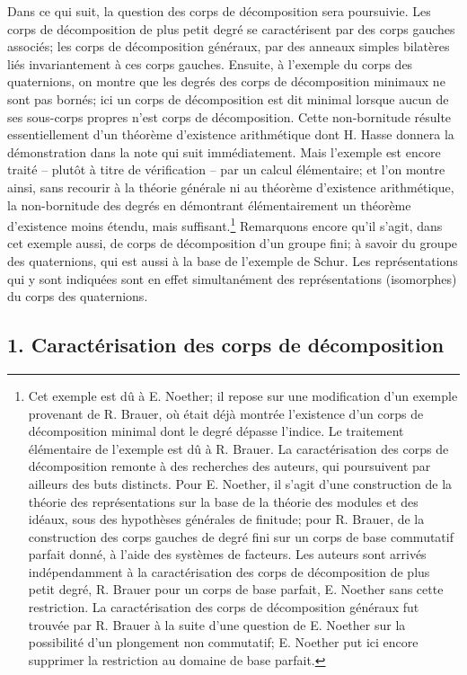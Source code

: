 Dans ce qui suit, la question des corps de décomposition sera poursuivie. Les corps de décomposition de plus petit degré se caractérisent par des corps gauches associés; les corps de décomposition généraux, par des anneaux simples bilatères liés invariantement à ces corps gauches. Ensuite, à l'exemple du corps des quaternions, on montre que les degrés des corps de décomposition minimaux ne sont pas bornés; ici un corps de décomposition est dit minimal lorsque aucun de ses sous-corps propres n'est corps de décomposition. Cette non-bornitude résulte essentiellement d'un théorème d'existence arithmétique dont H. Hasse donnera la démonstration dans la note qui suit immédiatement. Mais l'exemple est encore traité -- plutôt à titre de vérification -- par un calcul élémentaire; et l'on montre ainsi, sans recourir à la théorie générale ni au théorème d'existence arithmétique, la non-bornitude des degrés en démontrant élémentairement un théorème d'existence moins étendu, mais suffisant.\footnote{Cet exemple est dû à E. Noether; il repose sur une modification d'un exemple provenant de R. Brauer, où était déjà montrée l'existence d'un corps de décomposition minimal dont le degré dépasse l'indice. Le traitement élémentaire de l'exemple est dû à R. Brauer. La caractérisation des corps de décomposition remonte à des recherches des auteurs, qui poursuivent par ailleurs des buts distincts. Pour E. Noether, il s'agit d'une construction de la théorie des représentations sur la base de la théorie des modules et des idéaux, sous des hypothèses générales de finitude; pour R. Brauer, de la construction des corps gauches de degré fini sur un corps de base commutatif parfait donné, à l'aide des systèmes de facteurs. Les auteurs sont arrivés indépendamment à la caractérisation des corps de décomposition de plus petit degré, R. Brauer pour un corps de base parfait, E. Noether sans cette restriction. La caractérisation des corps de décomposition généraux fut trouvée par R. Brauer à la suite d'une question de E. Noether sur la possibilité d'un plongement non commutatif; E. Noether put ici encore supprimer la restriction au domaine de base parfait.} Remarquons encore qu'il s'agit, dans cet exemple aussi, de corps de décomposition d'un groupe fini; à savoir du groupe des quaternions, qui est aussi à la base de l'exemple de Schur. Les représentations qui y sont indiquées sont en effet simultanément des représentations (isomorphes) du corps des quaternions.

\subsection*{1. Caractérisation des corps de décomposition}

